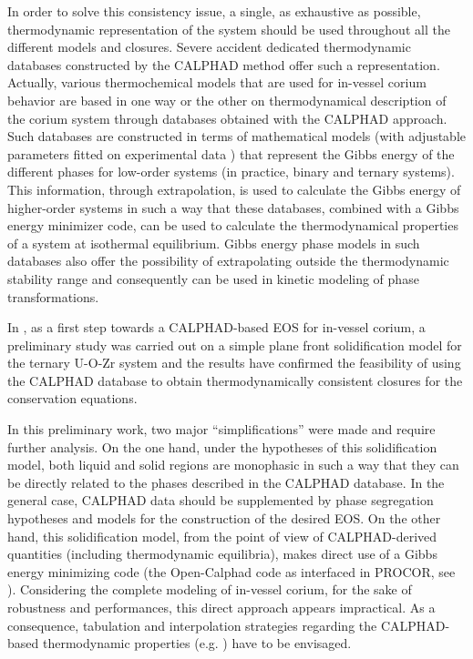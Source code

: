 \documentclass[11pt]{article}\usepackage{geometry} \geometry{letterpaper, margin=25.4mm}
\begin{document}
In order to solve this consistency issue, a single, as exhaustive as possible, thermodynamic representation of the system should be used throughout all the different models and closures. Severe accident dedicated thermodynamic databases constructed by the CALPHAD method \cite{Lukas2007} offer such a representation. Actually, various thermochemical models that are used for in-vessel corium behavior are based in one way or the other on thermodynamical description of the corium system through databases obtained with the CALPHAD approach. Such databases are constructed in terms of mathematical models (with adjustable parameters fitted on experimental data \cite{Barrachin2004, Gueneau2015}) that represent the Gibbs energy of the different phases for low-order systems (in practice, binary and ternary systems). This information, through extrapolation, is used to calculate the Gibbs energy of higher-order systems in such a way that these databases, combined with a Gibbs energy minimizer code, can be used to calculate the thermodynamical properties of a system at isothermal equilibrium. Gibbs energy phase models in such databases also offer the possibility of extrapolating outside the thermodynamic stability range and consequently can be used in kinetic modeling of phase transformations.

In \cite{Tiwari2018}, as a first step towards a CALPHAD-based EOS for in-vessel corium, a preliminary study was carried out on a simple plane front solidification model for the ternary U-O-Zr system and the results have confirmed the feasibility of using the CALPHAD database to obtain thermodynamically consistent closures for the conservation equations. 

In this preliminary work, two major ``simplifications'' were made and require further analysis. On the one hand, under the hypotheses of this solidification model, both liquid and solid regions are monophasic in such a way that they can be directly related to the phases described in the CALPHAD database. In the general case, CALPHAD data should be supplemented by phase segregation hypotheses and models for the construction of the desired EOS. %
On the other hand, this solidification model, from the point of view of CALPHAD-derived quantities (including thermodynamic equilibria), makes direct use of a Gibbs energy minimizing code (the Open-Calphad code as interfaced in PROCOR, see \cite{Sundman2016}). Considering the complete modeling of in-vessel corium, for the sake of robustness and performances, this direct approach appears impractical. As a consequence, tabulation and interpolation strategies regarding the CALPHAD-based thermodynamic properties (e.g. \cite{Saad2015}) have to be envisaged.
\end{document}
